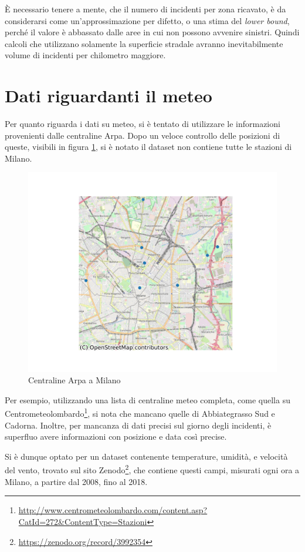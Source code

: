 \documentclass[a4paper,12pt]{report}
\newcommand{\quotestyle}[1]{\textit{#1}}
\begin{document}
\`E necessario tenere a mente, che il numero di incidenti per zona ricavato, 
è da considerarsi come un'approssimazione per difetto, o una stima del 
\quotestyle{lower bound}, perché il valore è abbassato dalle aree in cui non 
possono avvenire sinistri. 
Quindi calcoli che utilizzano solamente la superficie stradale avranno 
inevitabilmente volume di incidenti per chilometro maggiore. 

\section{Dati riguardanti il meteo}

Per quanto riguarda i dati su meteo, si è tentato di utilizzare le informazioni 
provenienti dalle centraline Arpa. 
Dopo un veloce controllo delle posizioni di queste, visibili in figura \ref{fig:centraline-arpa}, 
si è notato il dataset non contiene tutte le stazioni di Milano. 

\begin{figure}
    \hfill\includegraphics[width=0.7\linewidth]{../src/meteo/centraline_arpa.png}\hspace*{\fill}
    \caption{Centraline Arpa a Milano}
    \label{fig:centraline-arpa}
\end{figure}

Per esempio, utilizzando una lista di centraline meteo completa, come quella su 
Centrometeolombardo\footnote{\url{http://www.centrometeolombardo.com/content.asp?CatId=272&ContentType=Stazioni}}, 
si nota che mancano quelle di Abbiategrasso Sud e Cadorna. 
Inoltre, per mancanza di dati precisi sul giorno degli incidenti, 
è superfluo avere informazioni con posizione e data così precise. 

Si è dunque optato per un dataset contenente temperature, umidità, e velocità del vento, 
trovato sul sito Zenodo\footnote{\url{https://zenodo.org/record/3992354}},
che contiene questi campi, misurati ogni ora a Milano, a partire dal 2008, fino al 2018. 
\end{document}
